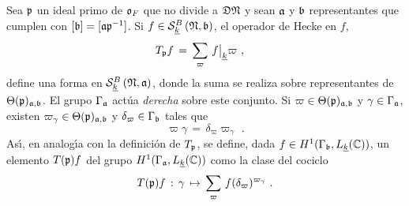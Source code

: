 Sea $\frak{p}$ un ideal primo de $\oka{F}$ que no divide a $\frak{D}\frak{N}$ y
sean $\frak{a}$ y $\frak{b}$ representantes que cumplen con
$[\frak{b}]=[\frak{a}\frak{p}^{-1}]$. Si
$f\in\spitzH[B]{k}{\frak{N},\frak{b}}$, el operador de Hecke en $f$,
\begin{align*}
	T_{\frak{p}}f & \,=\,\sum_{\varpi}\,
		f\operadormatrices{\peso{k}}{\varpi}
	\text{ ,}
\end{align*}
%
define una forma en $\spitzH[B]{k}{\frak{N},\frak{a}}$, donde la suma se
realiza sobre representantes de $\Theta(\frak{p})_{\frak{a},\frak{b}}$. El
grupo $\Gamma_{\frak{a}}$ act\'{u}a \emph{derecha} sobre este conjunto. Si
$\varpi\in\Theta(\frak{p})_{\frak{a},\frak{b}}$ y $\gamma\in\Gamma_{\frak{a}}$,
existen $\varpi_{\gamma}\in\Theta(\frak{p})_{\frak{a},\frak{b}}$ y
$\delta_{\varpi}\in\Gamma_{\frak{b}}$ tales que
\begin{equation}
	\label{eq:permutacionnormapmetodos}
	\varpi\gamma \,=\, \delta_{\varpi}\varpi_{\gamma}
	\text{ .}
\end{equation}
%
As\'{\i}, en analog\'{\i}a con la definici\'{o}n de $T_{\frak{p}}$,
se define, dada $f\in H^{1}(\Gamma_{\frak{b}},L_{\peso{k}}(\bb{C}))$,
un elemento $T(\frak{p})f$ del grupo
$H^{1}(\Gamma_{\frak{a}},L_{\peso{k}}(\bb{C}))$ como la clase del cociclo
\begin{equation}
	\label{eq:heckeencohomologia}
	T(\frak{p})f \,:\, \gamma\,\mapsto\,
		\sum_{\varpi}\,f(\delta_{\varpi})^{\varpi_{\gamma}}
	\text{ .}
\end{equation}
%

